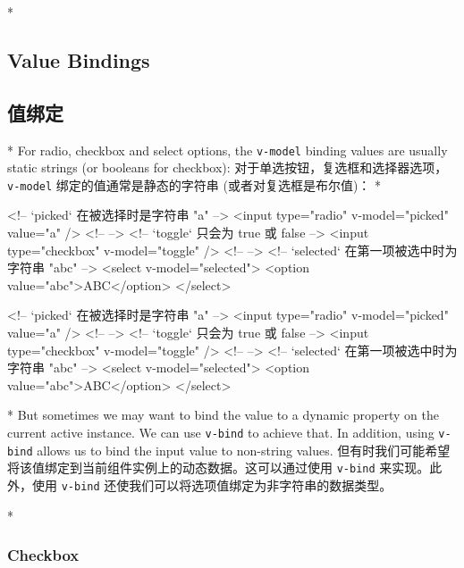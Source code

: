 \begin{paracol}{2}
\switchcolumn[0]*%
\subsection{Value Bindings}
\switchcolumn
\subsection{值绑定}
\switchcolumn[0]*%
For radio, checkbox and select options, the \texttt{v-model} binding
values are usually static strings (or booleans for checkbox):
\switchcolumn
对于单选按钮，复选框和选择器选项，\texttt{v-model}
绑定的值通常是静态的字符串 (或者对复选框是布尔值)：
\switchcolumn[0]*%
\begin{codeHtml}
<!-- `picked` 在被选择时是字符串 "a" -->
<input type="radio" v-model="picked" value="a" />
<!-- -->
<!-- `toggle` 只会为 true 或 false -->
<input type="checkbox" v-model="toggle" />
<!-- -->
<!-- `selected` 在第一项被选中时为字符串 "abc" -->
<select v-model="selected">
    <option value="abc">ABC</option>
</select>
\end{codeHtml}
\switchcolumn
\begin{codeHtml}
<!-- `picked` 在被选择时是字符串 "a" -->
<input type="radio" v-model="picked" value="a" />
<!-- -->
<!-- `toggle` 只会为 true 或 false -->
<input type="checkbox" v-model="toggle" />
<!-- -->
<!-- `selected` 在第一项被选中时为字符串 "abc" -->
<select v-model="selected">
    <option value="abc">ABC</option>
</select>
\end{codeHtml}
\switchcolumn[0]*%
But sometimes we may want to bind the value to a dynamic property on the
current active instance. We can use \texttt{v-bind} to achieve that. In
addition, using \texttt{v-bind} allows us to bind the input value to
non-string values.
\switchcolumn
但有时我们可能希望将该值绑定到当前组件实例上的动态数据。这可以通过使用
\texttt{v-bind} 来实现。此外，使用 \texttt{v-bind}
还使我们可以将选项值绑定为非字符串的数据类型。


\switchcolumn[0]*%
\subsubsection{Checkbox}
\switchcolumn

\end{paracol}
